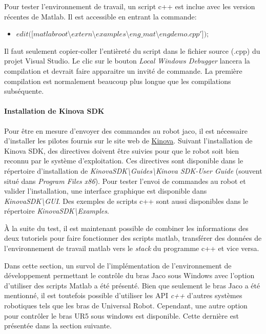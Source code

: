 Pour tester l'environnement de travail, un script c++ est inclue avec les version récentes de Matlab. 
Il est accessible en entrant la commande:
\begin{itemize}
\item $ edit([ matlabroot $\textbackslash$ extern$\textbackslash$ examples$\textbackslash$ eng\_mat$\textbackslash$ engdemo.cpp' ]);$
\end{itemize}

Il faut seulement copier-coller l'entièreté du script dans le fichier source (.cpp) du projet Visual Studio. Le clic sur le bouton \textit{Local Windows Debugger} lancera la compilation et devrait faire apparaitre un invité de commande. 
La première compilation est normalement beaucoup plus longue que les compilations subséquente.

\paragraph{Installation de Kinova SDK}
Pour être en mesure d'envoyer des commandes au robot jaco, il est nécessaire d'installer les pilotes fournis sur le site web de \href{https://drive.google.com/open?id=0B790iVm0vRTlRFNFRldIb2Jmbkk}{Kinova}.
Suivant l'installation de Kinova SDK, des directives doivent être suivies pour que le robot soit bien reconnu par le système d'exploitation.
Ces directives sont disponible dans le répertoire d'installation de \textit{KinovaSDK\textbackslash Guides\textbackslash Kinova SDK-User Guide} (souvent situé dans \textit{Program Files x86}).
Pour tester l'envoi de commandes au robot et valider l'installation, une interface graphique est disponible dans \textit{KinovaSDK\textbackslash GUI}.
Des exemples de scripts c++ sont aussi disponibles dans le répertoire \textit{KinovaSDK\textbackslash Examples}.


À la suite du test, il est maintenant possible de combiner les informations des deux tutoriels pour faire fonctionner des scripts matlab, transférer des données de l'environnement de travail matlab vers le \textit{stack} du programme c++ et vice versa.

Dans cette section, un survol de l'implémentation de l'environnement de développement permettant le contrôle du bras Jaco sous Windows avec l'option d'utiliser des scripts Matlab a été présenté.
Bien que seulement le bras Jaco a été mentionné, il est toutefois possible d'utiliser les API \textit{c++} d'autres systèmes robotiques tels que les bras de Universal Robot. 
Cependant, une autre option pour contrôler le bras UR5 sous windows est disponible.
Cette dernière est présentée dans la section suivante.

